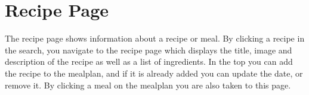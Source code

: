 \section{Recipe Page}
The recipe page shows information about a recipe or meal. By clicking a recipe in the search, you navigate to the recipe page which displays the title, image and description of the recipe as well as a list of ingredients. In the top you can add the recipe to the mealplan, and if it is already added you can update the date, or remove it.
By clicking a meal on the mealplan you are also taken to this page.

